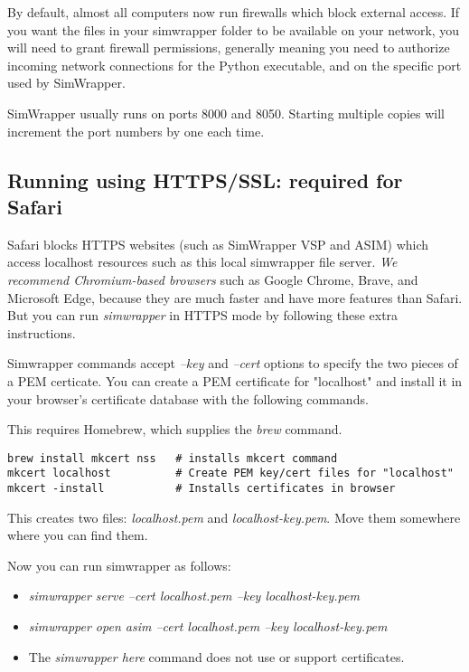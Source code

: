 By default, almost all computers now run firewalls which block external access. If you want the files in your simwrapper folder to be available on your network, you will need to grant firewall permissions, generally meaning you need to authorize incoming network connections for the Python executable, and on the specific port used by SimWrapper.

SimWrapper usually runs on ports 8000 and 8050. Starting multiple copies will increment the port numbers by one each time.

\subsection{Running using HTTPS/SSL: required for Safari}

Safari blocks HTTPS websites (such as SimWrapper VSP and ASIM) which access localhost resources such as this local simwrapper file server. \emph{We recommend Chromium-based browsers} such as Google Chrome, Brave, and Microsoft Edge, because they are much faster and have more features than Safari. But you can run \emph{simwrapper} in HTTPS mode by following these extra instructions.

Simwrapper commands accept \emph{--key} and \emph{--cert} options to specify the two pieces of a PEM certicate. You can create a PEM certificate for "localhost" and install it in your browser's certificate database with the following commands.

This requires Homebrew, which supplies the \emph{brew} command.

\begin{lstlisting}
brew install mkcert nss   # installs mkcert command
mkcert localhost          # Create PEM key/cert files for "localhost"
mkcert -install           # Installs certificates in browser
\end{lstlisting}

This creates two files: \emph{localhost.pem} and \emph{localhost-key.pem}. Move them somewhere where you can find them.

Now you can run simwrapper as follows:

\begin{itemize}
  \tightlist
  \item
    \emph{simwrapper serve --cert localhost.pem --key localhost-key.pem}
  \item
    \emph{simwrapper open asim --cert localhost.pem --key localhost-key.pem}
  \item
    The \emph{simwrapper here} command does not use or support certificates.
\end{itemize}


